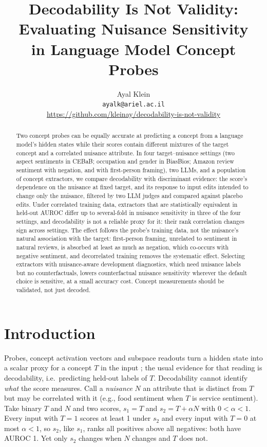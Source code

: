 \documentclass[11pt]{article}
\title{Decodability Is Not Validity: Evaluating Nuisance Sensitivity\\in Language Model Concept Probes}
\author{Ayal Klein \\
  \texttt{ayalk@ariel.ac.il} \\
  \small\url{https://github.com/kleinay/decodability-is-not-validity}}
\begin{document}
\maketitle

\begin{abstract}
Two concept probes can be equally accurate at predicting a concept from a language model's hidden states while their scores contain different mixtures of the target concept and a correlated nuisance attribute. In four target--nuisance settings (two aspect sentiments in CEBaB; occupation and gender in BiasBios; Amazon review sentiment with negation, and with first-person framing), two LLMs, and a population of concept extractors, we compare decodability with discriminant evidence: the score's dependence on the nuisance at fixed target, and its response to input edits intended to change only the nuisance, filtered by two LLM judges and compared against placebo edits. Under correlated training data, extractors that are statistically equivalent in held-out AUROC differ up to several-fold in nuisance sensitivity in three of the four settings, and decodability is not a reliable proxy for it: their rank correlation changes sign across settings. The effect follows the probe's training data, not the nuisance's natural association with the target: first-person framing, unrelated to sentiment in natural reviews, is absorbed at least as much as negation, which co-occurs with negative sentiment, and decorrelated training removes the systematic effect. Selecting extractors with nuisance-aware development diagnostics, which need nuisance labels but no counterfactuals, lowers counterfactual nuisance sensitivity wherever the default choice is sensitive, at a small accuracy cost. Concept measurements should be validated, not just decoded.
\end{abstract}

\section{Introduction}

Probes, concept activation vectors and subspace readouts turn a hidden state into a scalar proxy for a concept $T$ in the input \citep{alain2017understanding,kim2018tcav,belinkov2022probing,zou2023representation,marks2024geometry}; the usual evidence for that reading is decodability, i.e.\ predicting held-out labels of $T$. Decodability cannot identify \emph{what} the score measures. Call a \emph{nuisance} $N$ an attribute that is distinct from $T$ but may be correlated with it (e.g., food sentiment when $T$ is service sentiment). Take binary $T$ and $N$ and two scores, $s_1=T$ and $s_2=T+\alpha N$ with $0<\alpha<1$. Every input with $T{=}1$ scores at least 1 under $s_2$ and every input with $T{=}0$ at most $\alpha<1$, so $s_2$, like $s_1$, ranks all positives above all negatives: both have AUROC 1. Yet only $s_2$ changes when $N$ changes and $T$ does not.
\end{document}
